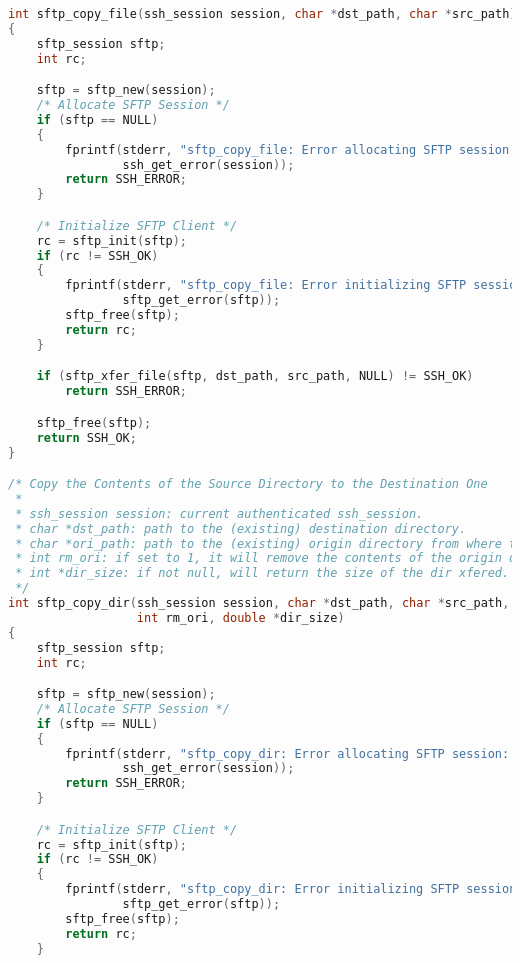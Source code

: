 \begin{lstlisting}[language=C,caption={Signature and schematic implementation of remote execution methods.},label={code:libssh}]
int sftp_copy_file(ssh_session session, char *dst_path, char *src_path)
{
    sftp_session sftp;
    int rc;

    sftp = sftp_new(session);
    /* Allocate SFTP Session */
    if (sftp == NULL)
    {
        fprintf(stderr, "sftp_copy_file: Error allocating SFTP session: %s\n",
                ssh_get_error(session));
        return SSH_ERROR;
    }

    /* Initialize SFTP Client */
    rc = sftp_init(sftp);
    if (rc != SSH_OK)
    {
        fprintf(stderr, "sftp_copy_file: Error initializing SFTP session: %d\n",
                sftp_get_error(sftp));
        sftp_free(sftp);
        return rc;
    }

    if (sftp_xfer_file(sftp, dst_path, src_path, NULL) != SSH_OK)
        return SSH_ERROR;

    sftp_free(sftp);
    return SSH_OK;
}

/* Copy the Contents of the Source Directory to the Destination One 
 *
 * ssh_session session: current authenticated ssh_session.
 * char *dst_path: path to the (existing) destination directory.
 * char *ori_path: path to the (existing) origin directory from where to copy.
 * int rm_ori: if set to 1, it will remove the contents of the origin directory.
 * int *dir_size: if not null, will return the size of the dir xfered.
 */
int sftp_copy_dir(ssh_session session, char *dst_path, char *src_path,
                  int rm_ori, double *dir_size)
{
    sftp_session sftp;
    int rc;

    sftp = sftp_new(session);
    /* Allocate SFTP Session */
    if (sftp == NULL)
    {
        fprintf(stderr, "sftp_copy_dir: Error allocating SFTP session: %s\n",
                ssh_get_error(session));
        return SSH_ERROR;
    }

    /* Initialize SFTP Client */
    rc = sftp_init(sftp);
    if (rc != SSH_OK)
    {
        fprintf(stderr, "sftp_copy_dir: Error initializing SFTP session: %d\n",
                sftp_get_error(sftp));
        sftp_free(sftp);
        return rc;
    }


\end{lstlisting}
